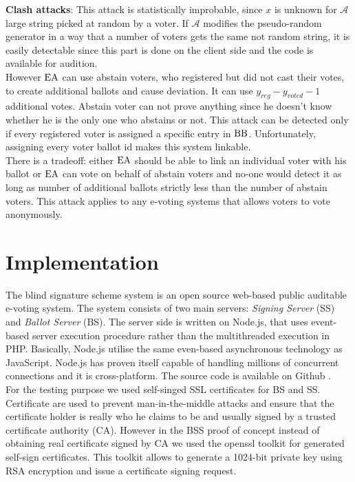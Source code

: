 \textbf{Clash attacks}: This attack is statistically improbable, since $x$ is unknown for $\mathcal{A}$ large string picked at random by a voter. If  $\mathcal{A}$ modifies the pseudo-random generator in a way that a number of voters gets the same not random string, it is easily detectable since  this part is done on the client side and the code is available for audition. \\

However $\operatorname{EA}$ can use abstain voters, who registered but did not cast their votes,  to create additional ballots and cause deviation. It can use $y_{reg} - y_{voted} -1$  additional votes. Abstain voter can not prove anything since he doesn't know whether he is the only one who abstains or not. This attack can be detected only if every registered voter is assigned a specific entry in $\operatorname{BB}$. Unfortunately,  assigning every voter ballot id makes this system linkable.\\

There is a tradeoff: either $\operatorname{EA}$ should be able to link an individual voter with his ballot or $\operatorname{EA}$ can vote on behalf of abstain voters and no-one would detect it as long as number of additional ballots strictly less than the number of abstain voters. This attack applies to any e-voting systems that allows voters to vote anonymously.  

\section{Implementation}
The blind signature scheme system is an open source web-based public auditable e-voting system. The system consists of two main servers: \textit{Signing Server} (SS) and \textit{Ballot Server} (BS). The server side is written on Node.js, that uses event-based server execution procedure rather than the multithreaded execution in PHP. Basically, Node.js utilise the same even-based  asynchronous technology as JavaScript. Node.js has proven itself capable of handling millions of concurrent connections and it is cross-platform. The source code is available on Github \cite{git}.\\

For the testing purpose we used self-singed SSL certificates for BS and SS. Certificate are used to prevent man-in-the-middle attacks and ensure that the certificate holder is really who he claims to be and usually signed by a trusted certificate authority (CA). However in the BSS proof of concept instead of obtaining real certificate signed by CA we used the openssl toolkit for generated self-sign certificates. This toolkit allows to generate a 1024-bit private key using RSA encryption and issue a certificate signing request.\\ 

